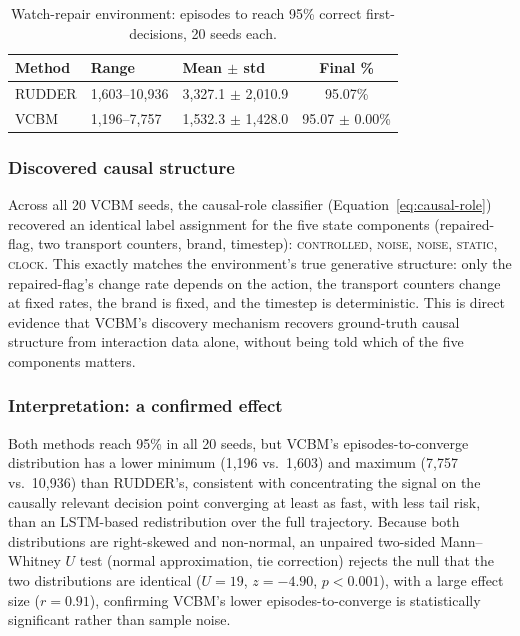 \documentclass[conference]{IEEEtran}
\begin{document}
\begin{table}[htbp]
  \centering
  \caption{Watch-repair environment: episodes to reach 95\% correct first-decisions, 20 seeds each.}
  \label{tab:watchrepair-results}
  \begin{tabular}{@{}lp{1.6cm}p{1.9cm}c@{}}
    \toprule
    \textbf{Method} & \textbf{Range} & \textbf{Mean $\pm$ std} & \textbf{Final \%} \\
    \midrule
    RUDDER & 1{,}603--10{,}936 & 3{,}327.1 $\pm$ 2{,}010.9 & 95.07\% \\
    VCBM   & 1{,}196--7{,}757  & 1{,}532.3 $\pm$ 1{,}428.0 & 95.07 $\pm$ 0.00\% \\
    \bottomrule
  \end{tabular}
\end{table}

\subsubsection{Discovered causal structure}
Across all 20 VCBM seeds, the causal-role classifier (Equation~\eqref{eq:causal-role}) recovered an identical label assignment for the five state components (repaired-flag, two transport counters, brand, timestep): \textsc{controlled}, \textsc{noise}, \textsc{noise}, \textsc{static}, \textsc{clock}. This exactly matches the environment's true generative structure: only the repaired-flag's change rate depends on the action, the transport counters change at fixed rates, the brand is fixed, and the timestep is deterministic. This is direct evidence that VCBM's discovery mechanism recovers ground-truth causal structure from interaction data alone, without being told which of the five components matters.

\subsubsection{Interpretation: a confirmed effect}
Both methods reach 95\% in all 20 seeds, but VCBM's episodes-to-converge distribution has a lower minimum (1{,}196 vs.\ 1{,}603) and maximum (7{,}757 vs.\ 10{,}936) than RUDDER's, consistent with concentrating the signal on the causally relevant decision point converging at least as fast, with less tail risk, than an LSTM-based redistribution over the full trajectory. Because both distributions are right-skewed and non-normal, an unpaired two-sided Mann--Whitney $U$ test (normal approximation, tie correction) rejects the null that the two distributions are identical ($U=19$, $z=-4.90$, $p<0.001$), with a large effect size ($r=0.91$), confirming VCBM's lower episodes-to-converge is statistically significant rather than sample noise.
\end{document}
